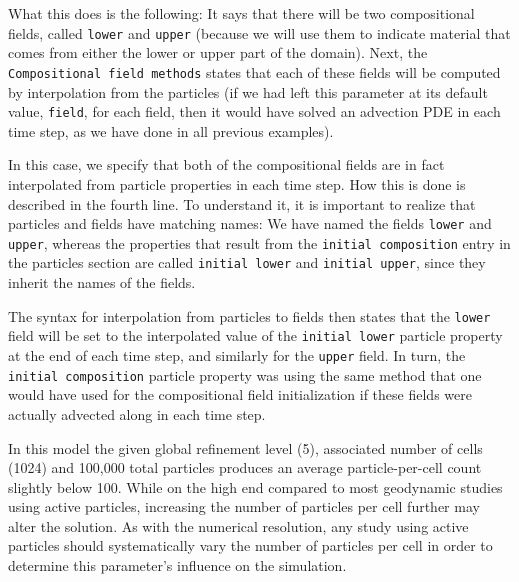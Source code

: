 \documentclass{article}
\begin{document}

 
What this does is the following: It says that there will be two
compositional fields, called \texttt{lower} and \texttt{upper}
(because we will use them to indicate material that comes from either
the lower or upper part of the domain). Next, the
\texttt{Compositional field methods} states that each of these fields
will be computed by interpolation from the particles (if we had left
this parameter at its default value, \texttt{field}, for each field,
then it would have solved an advection PDE in each time step, as we
have done in all previous examples).

In this case, we specify that both of the compositional fields are in
fact interpolated from particle properties in each time step. How this
is done is described in the fourth line. To understand it, it is
important to realize that particles and fields have matching names: We
have named the fields \texttt{lower} and \texttt{upper}, whereas the
properties that result from the \texttt{initial composition} entry in
the particles section are called \texttt{initial lower} and
\texttt{initial upper}, since they inherit the names of the fields.

The syntax for interpolation from particles to fields then
states that the \texttt{lower} field will be set to the interpolated
value of the \texttt{initial lower} particle property at the end of
each time step, and similarly
for the \texttt{upper} field. In turn, the
\texttt{initial composition} particle property was using the same
method that one would have used for the compositional field
initialization if these fields were actually advected along in each
time step.
 
In this model the given global refinement level (5), associated number of cells (1024) and 100,000 total particles produces an average particle-per-cell count slightly below 100.  While on the high end compared to most geodynamic studies using active particles, increasing the number of particles per cell further may alter the solution.  As with the numerical resolution, any study using active particles should systematically vary the number of particles per cell in order to determine this parameter's influence on the simulation.
\end{document}
